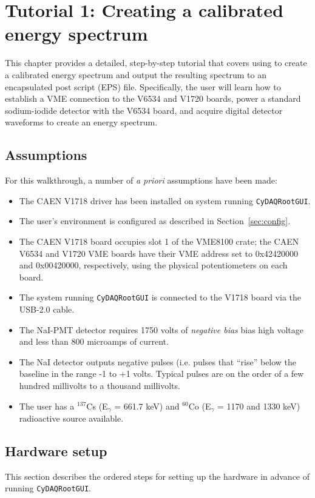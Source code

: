 \chapter{Tutorial 1: Creating a calibrated energy spectrum}
\label{chap:tutorial1}
This chapter provides a detailed, step-by-step tutorial that covers
using \ADAQ to create a calibrated energy spectrum and output the
resulting spectrum to an encapsulated post script (EPS) file.
Specifically, the user will learn how to establish a VME connection to
the V6534 and V1720 boards, power a standard sodium-iodide detector
with the V6534 board, and acquire digital detector waveforms to create
an energy spectrum.

\section{Assumptions}
\label{sec:assumptions1}
For this walkthrough, a number of \textit{a priori} assumptions have
been made:
\begin{itemize}
  \item{The CAEN V1718 driver has been installed on system running
    \texttt{CyDAQRootGUI}.}
  \item{The user's environment is configured as described in
    Section~\ref{sec:config}.}
  \item{The CAEN V1718 board occupies slot 1 of the VME8100 crate; the
    CAEN V6534 and V1720 VME boards have their VME address set to
    0x42420000 and 0x00420000, respectively, using the physical
    potentiometers on each board.}
  \item{The system running \texttt{CyDAQRootGUI} is connected to the
    V1718 board via the USB-2.0 cable.}
  \item{The NaI-PMT detector requires 1750 volts of \textit{negative
      bias} bias high voltage and less than 800 microamps of
    current.}
  \item{The NaI detector outputs negative pulses (i.e. pulses that
    ``rise'' below the baseline in the range -1 to +1 volts. Typical
    pulses are on the order of a few hundred millivolts to a
    thousand millivolts.}
  \item{The user has a $^{137}$Cs (E$_{\gamma}$ = 661.7 keV) and
    $^{60}$Co (E$_{\gamma}$ = 1170 and 1330 keV) radioactive
    source available.}
\end{itemize}


\section{Hardware setup}
\label{sec:hardwaresetup1}
This section describes the ordered steps for setting up the \ADAQ
hardware in advance of running \texttt{CyDAQRootGUI}.

